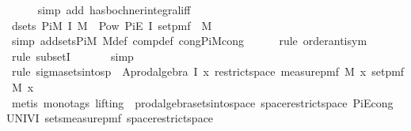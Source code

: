 \begin{isabellebody}
\ \ \ \ \isamarkupfalse%
\ {\isacharparenleft}{\kern0pt}simp\ add{\isacharcolon}{\kern0pt}\ has{\isacharunderscore}{\kern0pt}bochner{\isacharunderscore}{\kern0pt}integral{\isacharunderscore}{\kern0pt}iff{\isacharparenright}{\kern0pt}\isanewline
\isanewline
\ \ \isamarkupfalse%
\ d{\isacharcolon}{\kern0pt}{\isachardoublequoteopen}sets\ {\isacharparenleft}{\kern0pt}Pi\isactrlsub M\ I\ M{\isacharprime}{\kern0pt}{\isacharparenright}{\kern0pt}\ {\isacharequal}{\kern0pt}\ Pow\ {\isacharparenleft}{\kern0pt}Pi\isactrlsub E\ I\ {\isacharparenleft}{\kern0pt}set{\isacharunderscore}{\kern0pt}pmf\ {\isasymcirc}\ M{\isacharparenright}{\kern0pt}{\isacharparenright}{\kern0pt}{\isachardoublequoteclose}\isanewline
\ \ \ \ \isamarkupfalse%
\ {\isacharparenleft}{\kern0pt}simp\ add{\isacharcolon}{\kern0pt}sets{\isacharunderscore}{\kern0pt}PiM\ M{\isacharprime}{\kern0pt}{\isacharunderscore}{\kern0pt}def\ comp{\isacharunderscore}{\kern0pt}def\ cong{\isacharcolon}{\kern0pt}PiM{\isacharunderscore}{\kern0pt}cong{\isacharparenright}{\kern0pt}\isanewline
\ \ \ \ \isamarkupfalse%
\ {\isacharparenleft}{\kern0pt}rule\ order{\isacharunderscore}{\kern0pt}antisym{\isacharparenright}{\kern0pt}\isanewline
\ \ \ \ \ \isamarkupfalse%
\ {\isacharparenleft}{\kern0pt}rule\ subsetI{\isacharparenright}{\kern0pt}\isanewline
\ \ \ \ \ \isamarkupfalse%
\ {\isacharparenleft}{\kern0pt}simp{\isacharparenright}{\kern0pt}\isanewline
\ \ \ \ \ \isamarkupfalse%
\ {\isacharparenleft}{\kern0pt}rule\ sigma{\isacharunderscore}{\kern0pt}sets{\isacharunderscore}{\kern0pt}into{\isacharunderscore}{\kern0pt}sp\ {\isacharbrackleft}{\kern0pt}\ A{\isacharequal}{\kern0pt}{\isachardoublequoteopen}prod{\isacharunderscore}{\kern0pt}algebra\ I\ {\isacharparenleft}{\kern0pt}{\isasymlambda}x{\isachardot}{\kern0pt}\ restrict{\isacharunderscore}{\kern0pt}space\ {\isacharparenleft}{\kern0pt}measure{\isacharunderscore}{\kern0pt}pmf\ {\isacharparenleft}{\kern0pt}M\ x{\isacharparenright}{\kern0pt}{\isacharparenright}{\kern0pt}\ {\isacharparenleft}{\kern0pt}set{\isacharunderscore}{\kern0pt}pmf\ {\isacharparenleft}{\kern0pt}M\ x{\isacharparenright}{\kern0pt}{\isacharparenright}{\kern0pt}{\isacharparenright}{\kern0pt}{\isachardoublequoteclose}{\isacharbrackright}{\kern0pt}{\isacharparenright}{\kern0pt}\isanewline
\ \ \ \ \ \ \isamarkupfalse%
\ {\isacharparenleft}{\kern0pt}metis\ {\isacharparenleft}{\kern0pt}mono{\isacharunderscore}{\kern0pt}tags{\isacharcomma}{\kern0pt}\ lifting{\isacharparenright}{\kern0pt}\ \ prod{\isacharunderscore}{\kern0pt}algebra{\isacharunderscore}{\kern0pt}sets{\isacharunderscore}{\kern0pt}into{\isacharunderscore}{\kern0pt}space\ space{\isacharunderscore}{\kern0pt}restrict{\isacharunderscore}{\kern0pt}space\ PiE{\isacharunderscore}{\kern0pt}cong\ UNIV{\isacharunderscore}{\kern0pt}I\ sets{\isacharunderscore}{\kern0pt}measure{\isacharunderscore}{\kern0pt}pmf\ space{\isacharunderscore}{\kern0pt}restrict{\isacharunderscore}{\kern0pt}space{}{\isacharparenright}{\kern0pt}\isanewline

\end{isabellebody}
